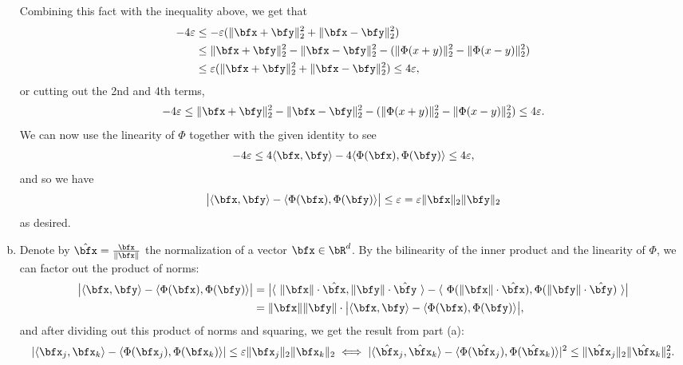 \begin{homework}[e]
\begin{prf}
\begin{enumerate}[(a)]
        Combining this fact with the inequality above, we get that
        \begin{align*} 
          -4\epsilon &\leq -\epsilon(\|\bfx + \bfy\|^2_2 + \|\bfx - \bfy\|^2_2) \\
          &\leq \|\bfx + \bfy\|^2_2 - \|\bfx - \bfy\|_2^2 - (\|\Phi(x + y)\|^2_2 - \|\Phi(x - y)\|^2_2)\\
          &\leq \epsilon(\|\bfx + \bfy\|^2_2 + \|\bfx - \bfy\|^2_2) \leq 4\epsilon,
        \end{align*}
        or cutting out the 2nd and 4th terms,
        \begin{align*}
          -4\epsilon \leq \|\bfx + \bfy\|^2_2 - \|\bfx - \bfy\|_2^2 - (\|\Phi(x + y)\|^2_2 - \|\Phi(x - y)\|^2_2)\leq 4\epsilon.
        \end{align*}
        We can now use the linearity of $\Phi$ together with the given identity to see
        \begin{align*}
          -4 \epsilon \leq 4\langle \bfx,\bfy \rangle - 4\langle \Phi(\bfx),\Phi(\bfy) \rangle \leq 4\epsilon,
        \end{align*}
        and so we have
        \begin{align*}
          \big|\langle \bfx,\bfy \rangle - \langle \Phi(\bfx),\Phi(\bfy) \rangle\big| \leq \epsilon = \epsilon\|\bfx\|_2\|\bfy\|_2
        \end{align*}
        as desired.
      \item Denote by $\hat{\bfx} = \frac{\bfx}{\|\bfx\|}$ the normalization of a vector $\bfx\in \bR^d$. By the bilinearity of the inner product and the linearity of $\Phi$, we can factor out the product of norms:
        \begin{align*} 
          \big|\langle \bfx,\bfy \rangle - \langle \Phi(\bfx),\Phi(\bfy) \rangle\big| 
            &= \big|\langle ~ \|\bfx\|\cdot \hat{\bfx},\|\bfy\|\cdot \hat{\bfy} ~\rangle - \langle ~\Phi(\|\bfx\|\cdot \hat{\bfx}),\Phi(\|\bfy\|\cdot \hat{\bfy}) ~\rangle\big|\\
            &= \|\bfx\|\|\bfy\|\cdot \big|\langle \bfx,\bfy \rangle - \langle \Phi(\bfx),\Phi(\bfy) \rangle\big|,
        \end{align*}
        and after dividing out this product of norms and squaring, we get the result from part (a):
        \begin{align*}
          |\langle \bfx_j,\bfx_k \rangle - \langle \Phi(\bfx_j),\Phi(\bfx_k) \rangle| \leq \epsilon \|\bfx_j\|_2\|\bfx_k\|_2 \iff 
          |\langle \hat{\bfx}_j,\hat{\bfx}_k \rangle - \langle \Phi(\hat{\bfx}_j),\Phi(\hat{\bfx}_k) \rangle|^2 \leq \|\hat{\bfx}_j\|_2\|\hat{\bfx}_k\|_2^2.

\end{align*}
\end{enumerate}
\end{prf}
\end{homework}
